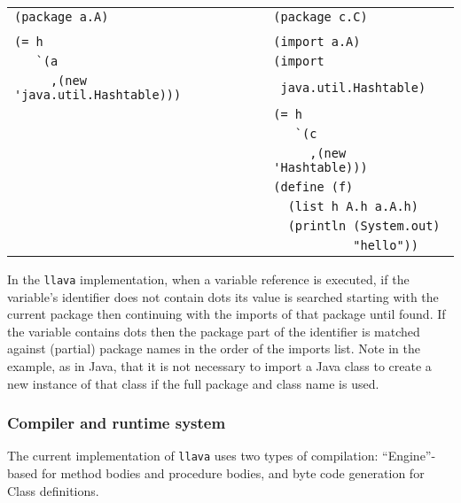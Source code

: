 \documentclass{acm-final/sig-alternate-modified}
\begin{document}
\scriptsize
\begin{tabular}{l|l}
\verb+(package a.A)+                                   & \verb+(package c.C)+ \\
                                                       &                     \\
\verb+(= h+                                            & \verb+(import a.A)+ \\
\verb+   `(a+                                          & \verb+(import+ \\
\verb+     ,(new 'java.util.Hashtable)))+              & \verb+ java.util.Hashtable)+ \\
                                                       & \verb+(= h+ \\
                                                       & \verb+   `(c+ \\
                                                       & \verb+     ,(new 'Hashtable)))+ \\
                                                       & \verb+(define (f)+ \\
                                                       & \verb+  (list h A.h a.A.h)+ \\
                                                       & \verb+  (println (System.out)+ \\
                                                       & \verb+           "hello"))+ \\
\end{tabular}
\normalsize

In the {\tt llava} implementation, when a variable reference is
executed, if the variable's identifier does not contain dots its value
is searched starting with the current package then continuing with the
imports of that package until found.  If the variable contains dots
then the package part of the identifier is matched against (partial)
package names in the order of the imports list.  Note in the example,
as in Java, that it is not necessary to import a Java class to create
a new instance of that class if the full package and class name is
used.


\subsubsection{Compiler and runtime system}

The current implementation of {\tt llava} uses two types of
compilation: ``Engine''-based for method bodies and procedure bodies,
and byte code generation for Class definitions.
\end{document}
